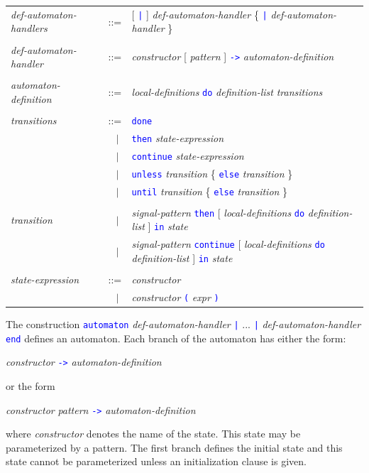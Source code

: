 \documentclass[11pt,titlepage,twoside]{report}
\newcommand{\alt}{\;|\;}
\newcommand{\Then}{\mbox{{\tt then}}}
\newcommand{\Continue}{\mbox{\tt continue}}
\newcommand{\Do}{\mbox{\tt do}}
\newcommand{\Done}{\mbox{\tt done}}
\newcommand{\term}[1]{\textcolor{Blue}{\tt #1}}
\newcommand{\nterm}[1]{\textcolor{BrickRed}{\it #1}}
\newcommand{\term}[1]{{\tt #1}}
\newcommand{\nterm}[1]{{\em #1}}
\begin{document}
\begin{center}
\begin{tabular}{lcl}
\nterm{def-automaton-handlers}
   & ::=        & [ \term{|} ] \nterm{def-automaton-handler}
                  \{ \term{|} \nterm{def-automaton-handler} \} 
\\ \\
\nterm{def-automaton-handler}
   & ::=        & \nterm{constructor} [ \nterm{pattern} ] \term{->}
                  \nterm{automaton-definition}
\\ \\
\nterm{automaton-definition}
   & ::=        & \nterm{local-definitions}
                  \term{\Do} \nterm{definition-list} \nterm{transitions}
\\ \\
\nterm{transitions}
   & ::=        & \term{\Done} \\
   & $\;\;\alt$ & \term{\Then} \nterm{state-expression} \\
   & $\;\;\alt$ & \term{\Continue} \nterm{state-expression} \\
   & $\;\;\alt$ & \term{unless} \nterm{transition}
                     \{ \term{else} \nterm{transition} \}
\\
   & $\;\;\alt$ & \term{until} \nterm{transition}
                     \{ \term{else} \nterm{transition} \}
\\ \\
\nterm{transition}
& $\;\;\alt$ & \nterm{signal-pattern} \term{\Then}
                  [ \nterm{local-definitions} \term{do} \nterm{definition-list} ]
                  \term{in} \nterm{state}
                  \\
& $\;\;\alt$ & \nterm{signal-pattern} \term{\Continue}
                  [ \nterm{local-definitions} \term{do} \nterm{definition-list} ]
                  \term{in} \nterm{state}
\\ \\
\nterm{state-expression}
   & ::=        & \nterm{constructor} \\
   & $\;\;\alt$ & \nterm{constructor} \term{(} \nterm{expr} \term{)}
\end{tabular}
\end{center}

The construction \term{automaton} \nterm{def-automaton-handler} \term{|}
... \term{|} \nterm{def-automaton-handler} \term{end} defines an
automaton. Each branch of the automaton has either the form:
\begin{center} 
  \nterm{constructor} \term{->} \nterm{automaton-definition}
\end{center}
or the form
\begin{center}
  \nterm{constructor} \nterm{pattern} \term{->} \nterm{automaton-definition}
\end{center}
where \nterm{constructor} denotes the name of the state. This state
may be parameterized by a pattern.  The first branch defines the
initial state and this state cannot be parameterized unless an 
initialization clause is given.
\end{document}
